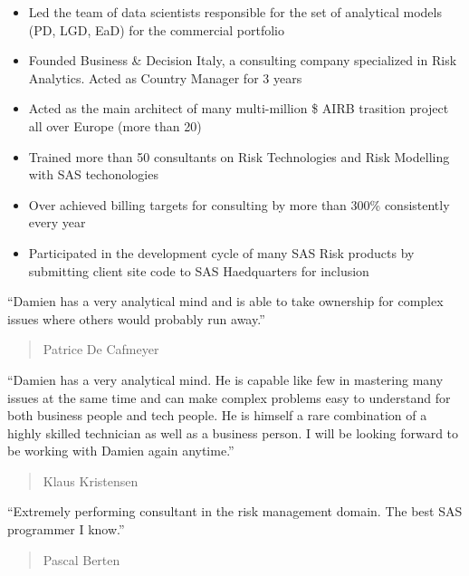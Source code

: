 \documentclass[10pt,a4paper]{altacv}
\begin{document}
\divider


\begin{itemize}
\item Led the team of data scientists responsible for the set of analytical models (PD, LGD, EaD) for the commercial portfolio
\end{itemize}

\divider


\begin{itemize}
\item Founded Business \& Decision Italy, a consulting company specialized in Risk Analytics. Acted as Country Manager for 3 years
\item Acted as the main architect of many multi-million \$ AIRB trasition project all over Europe (more than 20)
\item Trained more than 50 consultants on Risk Technologies and Risk Modelling with SAS techonologies
\item Over achieved billing targets for consulting by more than 300\% consistently every year
\item Participated in the development cycle of many SAS Risk products by submitting client site code to SAS Haedquarters for inclusion
\end{itemize}

\clearpage

\begin{fullwidth}

``Damien has a very analytical mind and is able to take ownership for complex issues where others would probably run away.''

\begin{quote}
Patrice De Cafmeyer
\end{quote}

\divider


``Damien has a very analytical mind. He is capable like few in mastering many issues at the same time and can make complex problems easy to understand for both business people and tech people. He is himself a rare combination of a highly skilled technician as well as a business person. I will be looking forward to be working with Damien again anytime.''

\begin{quote}
Klaus Kristensen
\end{quote}

\divider


``Extremely performing consultant in the risk management domain. The best SAS programmer I know.''

\begin{quote}
Pascal Berten
\end{quote}

\end{fullwidth}
\end{document}
